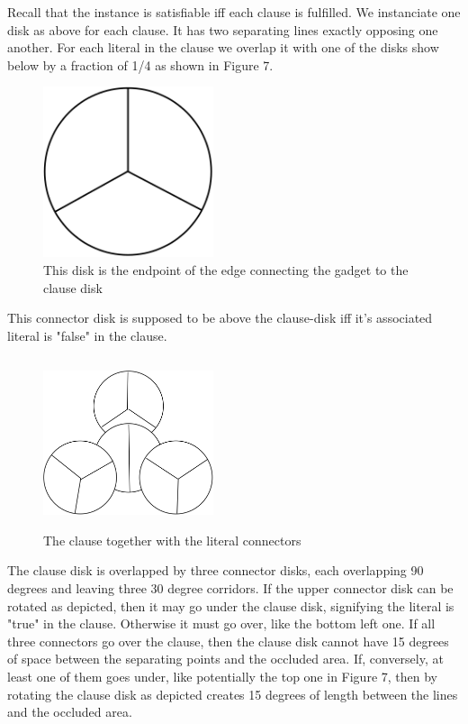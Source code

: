 \documentclass[a4paper,11pt]{article}
\begin{document}
Recall that the instance is satisfiable iff each clause is fulfilled. We instanciate one disk as above for each clause. It has two separating lines exactly opposing one another. For each literal in the clause we overlap it with one of the disks show below by a fraction of 1/4 as shown in Figure 7.

\begin{figure}[h]
\centering
\includegraphics[width=5cm, height=5cm]{assets/np-hardness/clause_connector.png}
\caption{This disk is the endpoint of the edge connecting the gadget to the clause disk}
\end{figure}

This connector disk is supposed to be above the clause-disk iff it's associated literal is "false" in the clause.

\begin{figure}[h]
\centering
\includegraphics[width=5cm, height=5cm]{assets/np-hardness/literal_clause.png}
\caption{The clause together with the literal connectors}
\end{figure}

The clause disk is overlapped by three connector disks, each overlapping 90 degrees and leaving three 30 degree corridors. If the upper connector disk can be rotated as depicted, then it may go under the clause disk, signifying the literal is "true" in the clause. Otherwise it must go over, like the bottom left one.
If all three connectors go over the clause, then the clause disk cannot have 15 degrees of space between the separating points and the occluded area. If, conversely, at least one of them goes under, like potentially the top one in Figure 7, then by rotating the clause disk as depicted creates 15 degrees of length between the lines and the occluded area.
\end{document}
